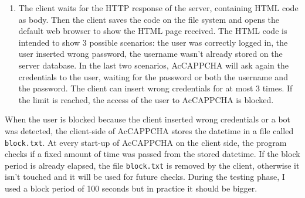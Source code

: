 \begin{enumerate}
{}
\item{The client waits for the HTTP response of the server, containing HTML code as body. Then the client saves the code on the file system and opens the default web browser to show the HTML page received. The HTML code is intended to show 3 possible scenarios: the user was correctly logged in, the user inserted wrong password, the username wasn't already stored on the server database. In the last two scenarios, AcCAPPCHA will ask again the credentials to the user, waiting for the password or both the username and the password. The client can insert wrong credentials for at most 3 times. If the limit is reached, the access of the user to AcCAPPCHA is blocked.}
\end{enumerate}
When the user is blocked because the client inserted wrong credentials or a bot was detected, the client-side of AcCAPPCHA stores the datetime in a file called \texttt{block.txt}. At every start-up of AcCAPPCHA on the client side, the program checks if a fixed amount of time was passed from the stored datetime. If the block period is already elapsed, the file \texttt{block.txt} is removed by the client, otherwise it isn't touched and it will be used for future checks. During the testing phase, I used a block period of 100 seconds but in practice it should be bigger.

